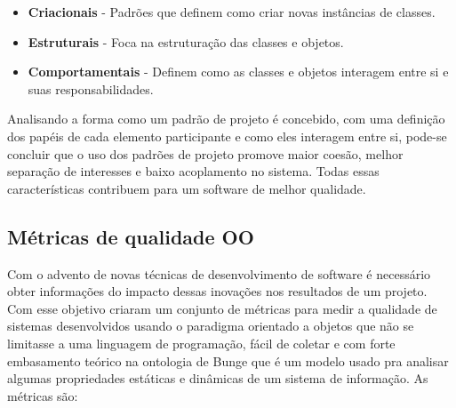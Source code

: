 \documentclass[conference]{IEEEtran}
\begin{document}
\begin{itemize}
\item \textbf{Criacionais} - Padrões que definem como criar novas instâncias de
classes.
\item \textbf{Estruturais} -  Foca na estruturação das classes e objetos.\\
\item \textbf{Comportamentais} - Definem como as classes e objetos interagem
entre si e suas responsabilidades.
\end{itemize}
Analisando a forma como um padrão de projeto é concebido, com uma definição
dos papéis de cada elemento participante e como eles interagem entre si,
pode-se concluir que o uso dos padrões de projeto promove maior coesão, melhor
separação de interesses e baixo acoplamento no sistema. Todas essas
características contribuem para um software de melhor qualidade.




\subsection{Métricas de qualidade OO}
\label{sec:metrics}




Com o advento de novas técnicas de desenvolvimento de software é necessário
obter informações do impacto dessas inovações nos resultados de um projeto. Com
esse objetivo \cite{cksuite} criaram um conjunto de métricas para
medir a qualidade de sistemas desenvolvidos usando o paradigma orientado a
objetos que não se limitasse a uma linguagem de programação, fácil de coletar e
com forte embasamento teórico na ontologia de Bunge que é um modelo usado pra
analisar algumas propriedades estáticas e dinâmicas de um sistema de
informação\cite{WandWeber}. As métricas são:

\end{document}
